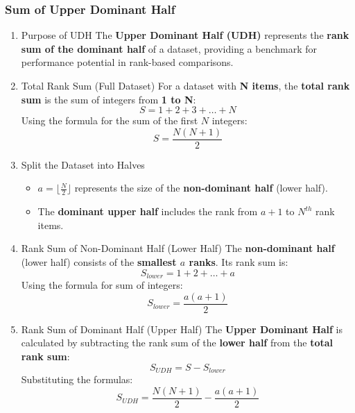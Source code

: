 \documentclass[a4paper,fleqn,review]{cas-sc}
\begin{document}
\subsubsection{Sum of Upper Dominant Half}
\begin{enumerate}
\item{Purpose of UDH}
The \textbf{Upper Dominant Half (UDH)} represents the \textbf{rank sum of the dominant half} of a dataset, providing a benchmark for performance potential in rank-based comparisons.

\item{Total Rank Sum (Full Dataset)}
For a dataset with \textbf{N items}, the \textbf{total rank sum} is the sum of integers from \textbf{1 to N}:
\begin{equation}
S = 1 + 2 + 3 + \ldots + N
\end{equation}
Using the formula for the sum of the first \( N \) integers:
\begin{equation}
S = \frac{N(N + 1)}{2}
\end{equation}

\item{Split the Dataset into Halves}
\begin{itemize}
  \item \( a = \lfloor \frac{N}{2} \rfloor \) represents the size of the \textbf{non-dominant half} (lower half).
  \item The \textbf{dominant upper half} includes the rank from \( a + 1 \) to \(N^{th}\) rank items.
\end{itemize}



\item{Rank Sum of Non-Dominant Half (Lower Half)}
The \textbf{non-dominant half} (lower half) consists of the \textbf{smallest \( a \) ranks}. Its rank sum is:
\begin{equation}
S_{lower} = 1 + 2 + \ldots + a
\end{equation}
Using the formula for sum of integers:
\begin{equation}
S_{lower} = \frac{a(a+1)}{2}
\end{equation}

\item{Rank Sum of Dominant Half (Upper Half)}
The \textbf{Upper Dominant Half} is calculated by subtracting the rank sum of the \textbf{lower half} from the \textbf{total rank sum}:
\begin{equation}
S_{UDH} = S - S_{lower}
\end{equation}
Substituting the formulas:
\begin{equation}
S_{UDH} = \frac{N(N + 1)}{2} - \frac{a(a+1)}{2}
\end{equation}


\end{enumerate}
\end{document}
